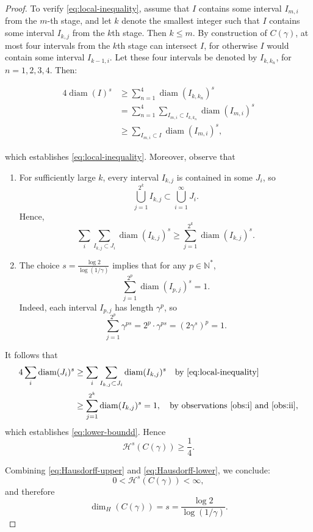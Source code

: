 \documentclass[12pt,a4paper]{report}
\theoremstyle{definition}
\begin{document}
\begin{proof}
To verify \eqref{eq:local-inequality}, assume that \( I \) contains some interval \( I_{m,i} \) from the \( m \)-th stage, and let \( k \) denote the smallest integer such that \( I \) contains some interval \( I_{k,j} \) from the \( k \)th stage. Then \( k \leq m \). By construction of \( C(\gamma) \), at most four intervals from the \( k \)th stage can intersect \( I \), for otherwise \( I \) would contain some interval \( I_{k-1,i} \). Let these four intervals be denoted by \( I_{k,k_n} \), for \( n = 1,2,3,4 \). Then:

\begin{align*}
4 \operatorname{diam}(I)^s
&\geq \sum_{n=1}^4 \operatorname{diam}(I_{k,k_n})^s \\
&= \sum_{n=1}^4 \sum_{I_{m,i} \subset I_{k,k_n}} \operatorname{diam}(I_{m,i})^s \\
&\geq \sum_{I_{m,i} \subset I} \operatorname{diam}(I_{m,i})^s,
\end{align*}

which establishes \eqref{eq:local-inequality}.
Moreover, observe that
\begin{enumerate}[label=(\roman*)]
    \item \label{obs:i} For sufficiently large \( k \), every interval \( I_{k,j} \) is contained in some \( J_i \), so
    \[
    \bigcup_{j=1}^{2^k} I_{k,j} \subset \bigcup_{i=1}^\infty J_i.
    \]
    Hence,
    \[
    \sum_i \sum_{I_{k,j} \subset J_i} \operatorname{diam}(I_{k,j})^s \geq \sum_{j=1}^{2^k} \operatorname{diam}(I_{k,j})^s.
    \]

    \item \label{obs:ii} The choice \( s = \frac{\log 2}{\log(1/\gamma)} \) implies that for any \( p \in \mathbb{N}^* \),
    \[
    \sum_{j=1}^{2^p} \operatorname{diam}(I_{p,j})^s = 1.
    \]
    Indeed, each interval \( I_{p,j} \) has length \( \gamma^p \), so
    \[
    \sum_{j=1}^{2^p} \gamma^{ps} = 2^p \cdot \gamma^{ps} = (2 \gamma^s)^p = 1.
    \]
\end{enumerate}

It follows that
\begin{align*}
4 \sum_i \operatorname{diam}(J_i)^s
&\geq \sum_i \sum_{I_{k,j} \subset J_i} \operatorname{diam}(I_{k,j})^s \quad \text{by \eqref{eq:local-inequality}} \\
&\geq \sum_{j=1}^{2^k} \operatorname{diam}(I_{k,j})^s = 1, \quad \text{by observations \ref{obs:i} and \ref{obs:ii}},
\end{align*}
which establishes \eqref{eq:lower-boundd}. Hence
\begin{equation}
\mathcal{H}^s(C(\gamma)) \geq \frac{1}{4}.
\label{eq:Hausdorff-lower}
\end{equation}

Combining \eqref{eq:Hausdorff-upper} and \eqref{eq:Hausdorff-lower}, we conclude:
\[
0 < \mathcal{H}^s(C(\gamma)) < \infty,
\]
and therefore
\[
\dim_{H}(C(\gamma)) = s = \frac{\log 2}{\log(1/\gamma)}.
\]
\end{proof}
\end{document}
